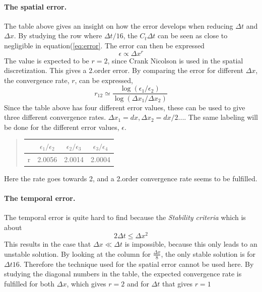 \documentclass[%
twoside,                 %
final,                   %
10pt]{article}
\begin{document}
\noindent

\paragraph{The spatial error.}
The table above gives an insight on how the error develops when reducing $\Delta t$ and $\Delta x$. By studying the row where $\Delta t/16$, the $C_t \Delta t$ can be seen as close to negligible in equation(\ref{eq:error}. The error can then be expressed 
\begin{equation}
    \epsilon \propto \Delta x^r
\end{equation}
The value is expected to be $r=2$, since Crank Nicolson is used in the spatial discretization. This gives a 2.order error. By comparing the error for different $\Delta x$, the convergence rate, $r$, can be expressed, 
\begin{equation} \label{eq:conv_rate}
 r_{12} \simeq \frac{\log(\epsilon_1/\epsilon_2)}{\log(\Delta x_1/\Delta x_2)}
\end{equation}
Since the table above has four different error values, these can be used to give three different convergence rates. $\Delta x_1 = dx, \Delta x_2 = dx/2...$. The same labeling will be done for the different error values, $\epsilon$.

\begin{quote}
\begin{tabular}{cccc}
\hline
\multicolumn{1}{c}{  } & \multicolumn{1}{c}{ $\epsilon_1/\epsilon_2$ } & \multicolumn{1}{c}{ $\epsilon_2/\epsilon_3$ } & \multicolumn{1}{c}{ $\epsilon_3/\epsilon_4$ } \\
\hline
r                       & 2.0056                  & 2.0014                  & 2.0004                  \\
\hline
\end{tabular}
\end{quote}

\noindent
Here the rate goes towards 2, and a 2.order convergence rate seems to be fulfilled.
\paragraph{The temporal error.}
The temporal error is quite hard to find because the \emph{Stability criteria} which is about
\begin{equation} \label{eq:stability_cr}
 2\Delta t \leq \Delta x^2
\end{equation}
This results in the case that $\Delta x \ll \Delta t$ is impossible, because this only leads to an unstable solution. By looking at the column for $\frac{\Delta x}{8}$, the only stable solution is for ${\Delta t}{16}$. Therefore the technique used for the spatial error cannot be used here. By studying the diagonal numbers in the table, the expected convergence rate is fulfilled for both $\Delta x$, which gives $r = 2$ and for $\Delta t$ that gives $r=1$   
\end{document}
